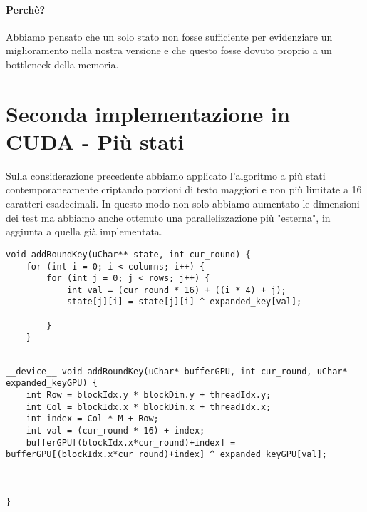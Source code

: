 \paragraph{Perchè?} Abbiamo pensato che un solo stato non fosse sufficiente per evidenziare un miglioramento nella nostra versione e che questo fosse dovuto proprio a un bottleneck della memoria.

\section{Seconda implementazione in CUDA - Più stati}
Sulla considerazione precedente abbiamo applicato l'algoritmo a più stati contemporaneamente criptando porzioni di testo maggiori e non più limitate a 16 caratteri esadecimali.
In questo modo non solo abbiamo aumentato le dimensioni dei test ma abbiamo anche ottenuto una parallelizzazione più "esterna", in aggiunta a quella già implementata.

\begin{lstlisting}[caption={Versione sequenziale di addROundKey}]
void addRoundKey(uChar** state, int cur_round) {
	for (int i = 0; i < columns; i++) {
		for (int j = 0; j < rows; j++) {
			int val = (cur_round * 16) + ((i * 4) + j);
			state[j][i] = state[j][i] ^ expanded_key[val];

		}
	}
	
	\end{lstlisting}

\begin{lstlisting}[caption={Versione parallela di addROundKey}]
__device__ void addRoundKey(uChar* bufferGPU, int cur_round, uChar* expanded_keyGPU) {
	int Row = blockIdx.y * blockDim.y + threadIdx.y;
	int Col = blockIdx.x * blockDim.x + threadIdx.x;
	int index = Col * M + Row;
	int val = (cur_round * 16) + index;
	bufferGPU[(blockIdx.x*cur_round)+index] = bufferGPU[(blockIdx.x*cur_round)+index] ^ expanded_keyGPU[val];
	


}
\end{lstlisting}

